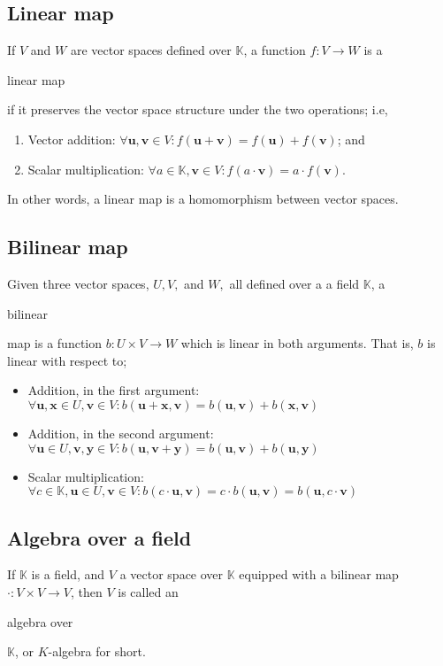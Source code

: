 \documentclass{article}
\newenvironment{itemized}{ 
\begin{itemize}
\setlength{\itemsep}{0pt}
\setlength{\parskip}{0pt}
\setlength{\parsep}{0pt}     
}{\end{itemize}}
\newenvironment{enumerated}{ 
\begin{enumerate}
\setlength{\itemsep}{0pt}
\setlength{\parskip}{0pt}
\setlength{\parsep}{0pt}     
}{\end{enumerate}}
\renewcommand{\vec}[1]{\mathbf{#1}}
\begin{document}
\subsection*{Linear map}
If $V$ and $W$ are vector spaces defined over $\mathbb{K}$, a function $f : V \rightarrow W$ is a \begin{em}linear map\end{em} if it preserves the vector space structure under the two operations; i.e,
\begin{enumerated}
  \item Vector addition: $ \forall \vec{u}, \vec{v} \in V : f(\vec{u} + \vec{v}) = f(\vec{u}) + f(\vec{v}) $; and
  \item Scalar multiplication: $ \forall a \in \mathbb{K}, \vec{v} \in V : f(a \cdot \vec{v}) = a \cdot f(\vec{v}). $
\end{enumerated}
In other words, a linear map is a homomorphism between vector spaces.

\subsection*{Bilinear map}
Given three vector spaces, $U, V, $ and $W,$ all defined over a a field $\mathbb{K}$, a \begin{em}bilinear\end{em} map is a function $b : U \times V \rightarrow W$ which is linear in both arguments. That is, $b$ is linear with respect to;
\begin{itemized}
  \item Addition, in the first argument: $ \forall \vec{u}, \vec{x} \in U, \vec{v} \in V : b(\vec{u} + \vec{x}, \vec{v}) = b(\vec{u}, \vec{v}) + b(\vec{x}, \vec{v}) $
  \item Addition, in the second argument: $ \forall \vec{u} \in U, \vec{v}, \vec{y} \in V : b(\vec{u}, \vec{v} + \vec{y}) = b(\vec{u}, \vec{v}) + b(\vec{u}, \vec{y}) $
  \item Scalar multiplication: $ \forall c \in \mathbb{K}, \vec{u} \in U, \vec{v} \in V : b(c \cdot \vec{u}, \vec{v}) = c \cdot b(\vec{u}, \vec{v}) = b(\vec{u}, c \cdot \vec{v}) $
\end{itemized}

\subsection*{Algebra over a field}
If $\mathbb{K}$ is a field, and $V$ a vector space over $\mathbb{K}$ equipped with a bilinear map $\cdot : V \times V \rightarrow V$, then $V$ is called an \begin{em}algebra over\end{em} $\mathbb{K}$, or $K$-algebra for short.
\end{document}
